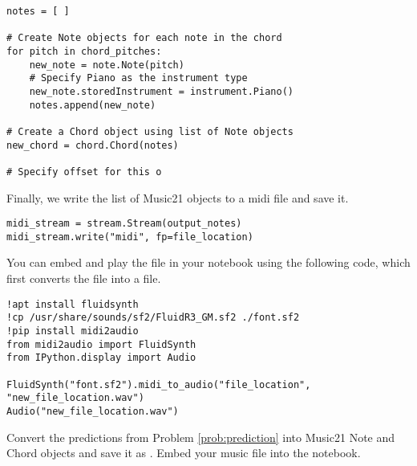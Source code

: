 \begin{lstlisting}
notes = [ ]

# Create Note objects for each note in the chord
for pitch in chord_pitches:
    new_note = note.Note(pitch)
    # Specify Piano as the instrument type
    new_note.storedInstrument = instrument.Piano()
    notes.append(new_note)

# Create a Chord object using list of Note objects
new_chord = chord.Chord(notes)

# Specify offset for this o
\end{lstlisting}

\noindent Finally, we write the list of Music21 objects to a midi file and save it.

\begin{lstlisting}
midi_stream = stream.Stream(output_notes)
midi_stream.write("midi", fp=file_location)
\end{lstlisting}

\noindent You can embed and play the file in your notebook using the following code, which first converts the  file into a  file.
\begin{lstlisting}
!apt install fluidsynth
!cp /usr/share/sounds/sf2/FluidR3_GM.sf2 ./font.sf2
!pip install midi2audio
from midi2audio import FluidSynth
from IPython.display import Audio

FluidSynth("font.sf2").midi_to_audio("file_location", "new_file_location.wav")
Audio("new_file_location.wav")
\end{lstlisting}

\begin{problem}
Convert the predictions from Problem \ref{prob:prediction} into Music21 Note and Chord objects and save it as .
Embed your music file into the notebook.
\end{problem}
